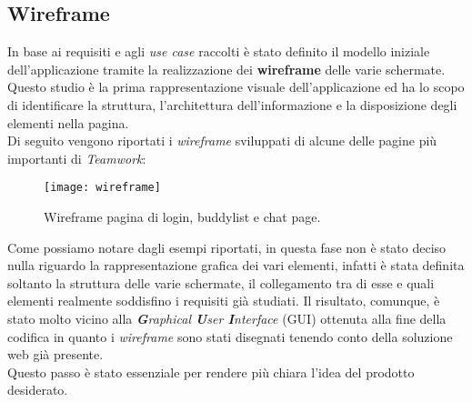 \subsection{Wireframe}
In base ai requisiti e agli \emph{use case} raccolti è stato definito il modello iniziale
 dell'applicazione tramite la realizzazione dei \textbf{wireframe} delle varie schermate. \\
Questo studio è la prima rappresentazione visuale dell'applicazione ed ha lo 
scopo di identificare la struttura, l'architettura dell'informazione e la 
disposizione degli elementi nella pagina.\\
Di seguito vengono riportati i \emph{wireframe} sviluppati di alcune delle pagine più 
importanti di \emph{Teamwork}:
\begin{figure}[H] 
	\centering
	\texttt{[image: wireframe]}
	\caption{Wireframe pagina di login, buddylist e chat page.}
	\label{subsec:wireframe}
\end{figure}
Come possiamo notare dagli esempi riportati, in questa fase non è stato deciso 
nulla riguardo la rappresentazione grafica dei vari elementi, infatti 
è stata definita soltanto la struttura delle varie schermate, il collegamento
tra di esse e quali elementi realmente soddisfino i requisiti già studiati. 
Il risultato, comunque, è stato molto vicino alla \emph{\textbf{G}raphical \textbf{U}ser \textbf{I}nterface} (\acrshort{GUI}) ottenuta alla fine della 
codifica in quanto i \emph{wireframe} sono stati disegnati tenendo conto della 
soluzione web già presente.\\ 
Questo passo è stato essenziale per rendere più chiara l'idea del prodotto desiderato.

